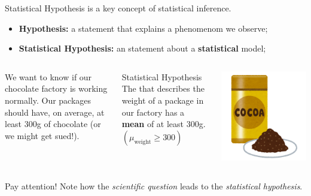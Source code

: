 \begin{frame}{Statistical Hypothesis}
   is a key concept of statistical inference.
  \begin{itemize}
    \item {\bf Hypothesis:} a statement that explains a phenomenom we observe;
    \item {\bf Statistical Hypothesis:} an statement about a {\bf statistical} model;
  \end{itemize}\bigskip

  \begin{columns}[T]
     We want to know if our chocolate factory is working normally. Our packages should have, on average, at least 300g of chocolate (or we might get sued!).

    \begin{block}{Statistical Hypothesis}
    The  that describes the weight of a package in our factory has a {\bf mean} of at least 300g. $(\mu_{\text{weight}} \ge 300)$
    \end{block}


    \includegraphics[width=\textwidth]{../img/irasutoya_cocoa}
  \end{columns}
  \vfill
  \alert{Pay attention!} Note how the \emph{scientific question} leads to the \emph{statistical hypothesis}.
\end{frame}

